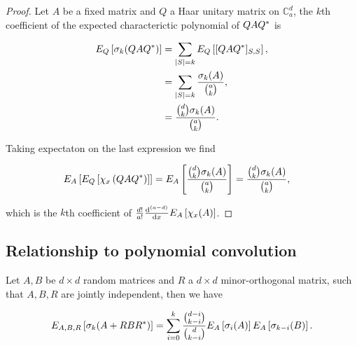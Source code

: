 \begin{proof}
    Let $A$ be a fixed matrix and $Q$ a Haar unitary matrix on $\mathbb C_{a}^d$, the $k$th coefficient of the expected characterictic polynomial of $QAQ^*$ is 

    \begin{align*}
        E_Q \left[ \sigma_k(QAQ^*) \right] &= \sum_{\lvert S \rvert = k} E_Q\left[ [QAQ^*]_{S,S} \right],\\ 
        &= \sum_{\lvert S \rvert = k} \frac{\sigma_k(A)}{\binom ak},\\ 
        &= \frac{\binom{d}{k} \sigma_k(A)}{\binom{a}{k}}.
    \end{align*}

    Taking expectaton on the last expression we find

    \begin{align*}
        E_A \left[E_Q\left[ \chi_x \left( Q A Q^* \right) \right]\right] &= E_A \left[ \frac{\binom{d}{k} \sigma_k(A)}{\binom{a}{k}} \right] = \frac{\binom{d}{k} \sigma_k(A)}{\binom{a}{k}},
    \end{align*}

    \noindent which is the $k$th coefficient of $\frac{d!}{a!} \frac{\mathrm d^{(a-d)}}{\mathrm d x} E_A \left[\chi_x(A) \right]$.
\end{proof}

\subsection{Relationship to polynomial convolution}

\begin{theorem} \label{thm:implies_symmad}
    Let $A, B$ be $d\times d$ random matrices and $R$ a $d\times d$ minor-orthogonal matrix, such that $A, B, R$ are jointly independent, then we have

    \begin{equation*}
        E_{A,B,R}\left[ \sigma_k(A + RBR^*) \right] =  \sum_{i=0}^k \frac{\binom{d-i}{k-i}}{\binom{d}{k-i}}E_{A} \left[\sigma_i(A)\right] E_{A}\left[\sigma_{k-i}(B)\right].
    \end{equation*}
\end{theorem}

